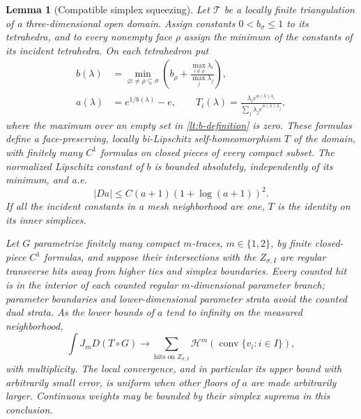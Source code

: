 \documentclass[11pt]{article}
\numberwithin{equation}{section}
\newtheorem{lemma}[theorem]{Lemma}
\theoremstyle{definition}
\theoremstyle{remark}
\begin{document}
\begin{lemma}[Compatible simplex squeezing]
\label{lt:squeeze}
Let $\mathcal T$ be a locally finite triangulation of a three-dimensional
open domain.  Assign constants $0<b_\sigma\leq1$ to its tetrahedra,
and to every nonempty face $\rho$ assign the minimum of the constants
of its incident tetrahedra.  On each tetrahedron put
\begin{align}
 b(\lambda)&=
 \min_{\varnothing\ne\rho\subseteq\sigma}
 \left(b_\rho+
        \frac{\max_{i\notin\rho}\lambda_i}{\max_j\lambda_j}\right),
       \label{lt:b-definition}\\
 a(\lambda)&=e^{1/b(\lambda)}-e,
 \qquad
 T_i(\lambda)=
 \frac{\lambda_i e^{a(\lambda)\lambda_i}}
             {\sum_j\lambda_j e^{a(\lambda)\lambda_j}},
       \label{lt:squeeze-definition}
\end{align}
where the maximum over an empty set in \eqref{lt:b-definition} is zero.
These formulas define a face-preserving, locally bi-Lipschitz
self-homeomorphism $T$ of the domain, with finitely many $C^1$ formulas
on closed pieces of every compact subset.  The normalized Lipschitz
constant of $b$ is bounded absolutely, independently of its minimum,
and a.e.
\begin{equation}
 |Da|\leq C(a+1)(1+\log(a+1))^2.
 \label{lt:a-derivative}
\end{equation}
If all the incident constants in a mesh neighborhood are one, $T$ is
the identity on its inner simplices.

Let $G$ parametrize finitely many compact $m$-traces, $m\in\{1,2\}$,
by finite closed-piece $C^1$ formulas, and suppose their intersections
with the $Z_{\sigma,I}$ are regular transverse hits away from higher
ties and simplex boundaries.  Every counted hit is in the interior
of each counted regular $m$-dimensional parameter branch; parameter
boundaries and lower-dimensional parameter strata avoid the counted
dual strata.  As the lower bounds of $a$ tend to
infinity on the measured neighborhood,
\begin{equation}
 \int J_mD(T\circ G)
 \longrightarrow
 \sum_{\text{hits on }Z_{\sigma,I}}
       \mathcal H^m(\operatorname{conv}\{v_i:i\in I\}),
 \label{lt:squeeze-area}
\end{equation}
with multiplicity.  The local convergence, and in particular its upper
bound with arbitrarily small error, is uniform when other floors of
$a$ are made arbitrarily larger.  Continuous weights may be bounded
by their simplex suprema in this conclusion.
\end{lemma}
\end{document}
